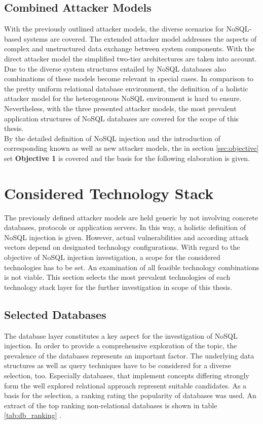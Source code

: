 \subsection{Combined Attacker Models}
With the previously outlined attacker models, the diverse scenarios for NoSQL-based systems are covered. The extended attacker model addresses the aspects of complex and unstructured data exchange between system components. With the direct attacker model the simplified two-tier architectures are taken into account. Due to the diverse system structures entailed by NoSQL databases also combinations of these models become relevant in special cases. In comparison to the pretty uniform relational database environment, the definition of a holistic attacker model for the heterogeneous NoSQL environment is hard to ensure. Nevertheless, with the three presented attacker models, the most prevalent application structures of NoSQL databases are covered for the scope of this thesis. \\

By the detailed definition of NoSQL injection and the introduction of corresponding known as well as new attacker models, the in section \ref{sec:objective} set \textbf{Objective 1} is covered and the basis for the following elaboration is given.


\section{Considered Technology Stack}

The previously defined attacker models are held generic by not involving concrete databases, protocols or application servers. In this way, a holistic definition of NoSQL injection is given. However, actual vulnerabilities and according attack vectors depend on designated technology configurations. With regard to the objective of NoSQL injection investigation, a scope for the considered technologies has to be set. An examination of all feasible technology combinations is not viable. This section selects the most prevalent technologies of each technology stack layer for the further investigation in scope of this thesis.

\subsection{Selected Databases}
The database layer constitutes a key aspect for the investigation of NoSQL injection. In order to provide a comprehensive exploration of the topic, the prevalence of the databases represents an important factor. The underlying data structures as well as query techniques have to be considered for a diverse selection, too. Especially databases, that implement concepts differing strongly form the well explored relational approach represent suitable candidates. As a basis for the selection, a ranking rating the popularity of databases was used. An extract of the top ranking non-relational databases is shown in table \ref{tab:db_ranking} \cite{Solid2016}.

